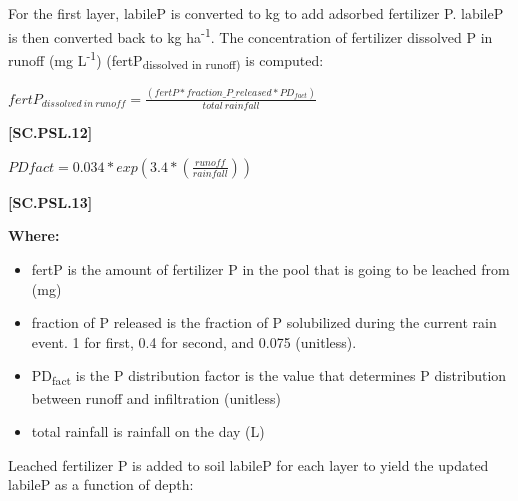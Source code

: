 For the first layer, labileP is converted to kg to add adsorbed fertilizer P. labileP is then converted back to kg ha\textsuperscript{-1}. The concentration of fertilizer dissolved P in runoff (mg L\textsuperscript{-1}) (fertP\textsubscript{dissolved in runoff)} is computed:
        \vspace{0.5cm}
        
    \begin{center}
\(fertP_{dissolved\ in\ runoff}=\frac{(fertP * fraction\_P\_released * PD_{fact})}{total\ rainfall}\)
    \end{center}
        \vspace{0.5cm} 
    
            {\raggedleft \textbf{[SC.PSL.12]}\par}
            \vspace{0.5cm}

    \begin{center}
\(PDfact=0.034 * exp(3.4 *(\frac{runoff}{rainfall}))\)

    \end{center}
        \vspace{0.5cm} 
    
            {\raggedleft \textbf{[SC.PSL.13]}\par}
            \vspace{0.5cm}

        \textbf{Where:}
            
        \begin{itemize}
            \item fertP is the amount of fertilizer P in the pool that is going to be leached from (mg)
            \item fraction of P released is the fraction of P solubilized during the current rain event. 1 for first, 0.4 for second, and 0.075 (unitless).
            \item PD\textsubscript{fact} is the P distribution factor is the value that determines P distribution between runoff and infiltration (unitless)
            \item total rainfall is rainfall on the day (L)
        \end{itemize}
        \vspace{0.5cm}

\parencite{vadas2007}
Leached fertilizer P is added to soil labileP for each layer to yield the updated labileP as a function of depth:
        \vspace{0.5cm}
        
